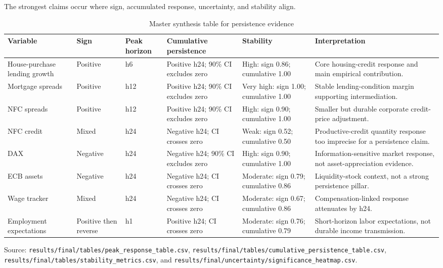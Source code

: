 The strongest claims occur where sign, accumulated response, uncertainty, and stability align.

\begin{table}[htbp]
  \centering
  \caption{Master synthesis table for persistence evidence}
  \label{tab:persistence-synthesis}
  \scriptsize
  \setlength{\tabcolsep}{3pt}
  \begin{tabularx}{\textwidth}{@{}>{\raggedright\arraybackslash}p{}>{\raggedright\arraybackslash}p{}>{\raggedright\arraybackslash}p{}>{\raggedright\arraybackslash}p{}>{\raggedright\arraybackslash}p{}>{\raggedright\arraybackslash}X@{}}
    \toprule
    Variable & Sign & Peak horizon & Cumulative persistence & Stability & Interpretation \\
    \midrule
    House-purchase lending growth & Positive & h6 & Positive h24; 90\% CI excludes zero & High: sign 0.86; cumulative 1.00 & Core housing-credit response and main empirical contribution. \\
    Mortgage spreads & Positive & h12 & Positive h24; 90\% CI excludes zero & Very high: sign 1.00; cumulative 1.00 & Stable lending-condition margin supporting intermediation. \\
    NFC spreads & Positive & h12 & Positive h24; 90\% CI excludes zero & High: sign 0.90; cumulative 1.00 & Smaller but durable corporate credit-price adjustment. \\
    NFC credit & Mixed & h24 & Negative h24; CI crosses zero & Weak: sign 0.52; cumulative 0.50 & Productive-credit quantity response too imprecise for a persistence claim. \\
    DAX & Negative & h24 & Negative h24; 90\% CI excludes zero & High: sign 0.90; cumulative 1.00 & Information-sensitive market response, not asset-appreciation evidence. \\
    ECB assets & Negative & h24 & Negative h24; CI crosses zero & Moderate: sign 0.79; cumulative 0.86 & Liquidity-stock context, not a strong persistence pillar. \\
    Wage tracker & Mixed & h24 & Negative h24; CI crosses zero & Moderate: sign 0.67; cumulative 0.86 & Compensation-linked response attenuates by h24. \\
    Employment expectations & Positive then reverse & h1 & Positive h24; CI crosses zero & Moderate: sign 0.76; cumulative 0.79 & Short-horizon labor expectations, not durable income transmission. \\
    \bottomrule
  \end{tabularx}
  \vspace{0.25em}
  {\footnotesize Source: \nolinkurl{results/final/tables/peak_response_table.csv}, \nolinkurl{results/final/tables/cumulative_persistence_table.csv}, \nolinkurl{results/final/tables/stability_metrics.csv}, and \nolinkurl{results/final/uncertainty/significance_heatmap.csv}.}
\end{table}

